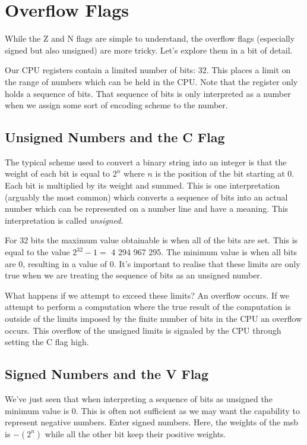\section{Overflow Flags}
While the Z and N flags are simple to understand, the overflow flags (especially signed but also unsigned) are more tricky. Let's explore them in a bit of detail. 

Our CPU registers contain a limited number of bits: 32. This places a limit on the range of numbers which can be held in the CPU. Note that the register only holds a sequence of bits. That sequence of bits is only interpreted as a number when we assign some sort of encoding scheme to the number. 

\subsection{Unsigned Numbers and the C Flag}
The typical scheme used to convert a binary string into an integer is that the weight of each bit is equal to $2^{n}$ where $n$ is the position of the bit starting at 0. Each bit is multiplied by its weight and summed. This is one interpretation (arguably the most common) which converts a sequence of bits into an actual number which can be represented on a number line and have a meaning. This interpretation is called \emph{unsigned}.

For 32 bits the maximum value obtainable is when all of the bits are set. This is equal to the value $2^{32} - 1 = $ 4 294 967 295. The minimum value is when all bits are 0, resulting in a value of 0. It's important to realise that these limits are only true when we are treating the sequence of bits as an unsigned number. 

What happens if we attempt to exceed these limits? An overflow occurs. If we attempt to perform a computation where the true result of the computation is outside of the limits imposed by the finite number of bits in the CPU an overflow occurs. This overflow of the unsigned limits is signaled by the CPU through setting the C flag high.

\subsection{Signed Numbers and the V Flag}
We've just seen that when interpreting a sequence of bits as unsigned the minimum value is 0. This is often not sufficient as we may want the capability to represent negative numbers. Enter signed numbers. Here, the weights of the msb is $-(2^{n})$ while all the other bit keep their positive weights. 

